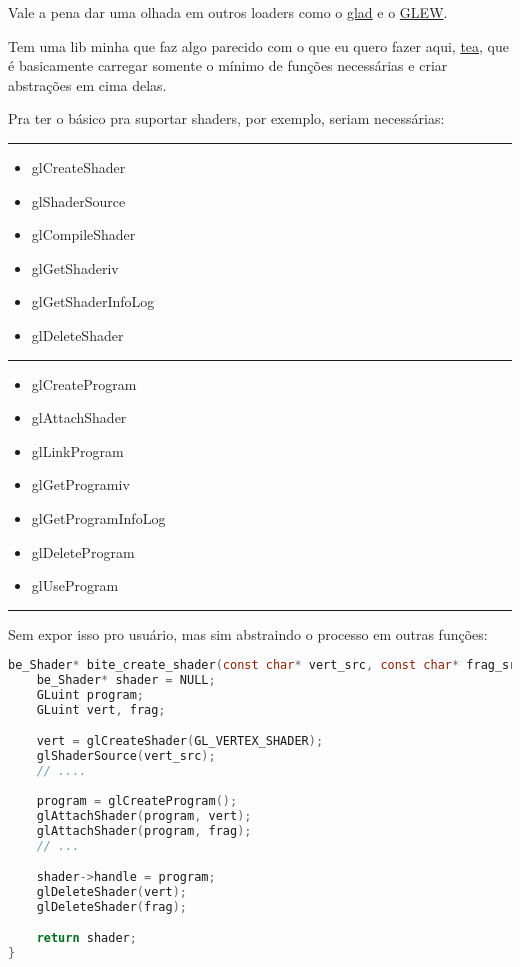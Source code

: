 \documentclass[a4paper,oneside,12pt]{article}
\begin{document}
Vale a pena dar uma olhada em outros loaders como o \href{https://glad.dav1d.de/}{glad} e o \href{https://glew.sourceforge.net/}{GLEW}.

Tem uma lib minha que faz algo parecido com o que eu quero fazer aqui, \href{https://github.com/cafe-engine/tea}{tea}, que é basicamente carregar somente o mínimo de funções necessárias e criar abstrações em cima delas.

Pra ter o básico pra suportar shaders, por exemplo, seriam necessárias:

\noindent\rule{\textwidth}{0.4pt}
\begin{itemize}
    \item glCreateShader
    \item glShaderSource
    \item glCompileShader
    \item glGetShaderiv
    \item glGetShaderInfoLog
    \item glDeleteShader
\end{itemize}
\noindent\rule{\textwidth}{0.4pt}
\begin{itemize}
    \item glCreateProgram
    \item glAttachShader
    \item glLinkProgram
    \item glGetProgramiv
    \item glGetProgramInfoLog
    \item glDeleteProgram
    \item glUseProgram
\end{itemize}
\noindent\rule{\textwidth}{0.4pt}

\noindent
Sem expor isso pro usuário, mas sim abstraindo o processo em outras funções:
\begin{lstlisting}[language=C]
be_Shader* bite_create_shader(const char* vert_src, const char* frag_src) {
    be_Shader* shader = NULL;
    GLuint program;
    GLuint vert, frag;

    vert = glCreateShader(GL_VERTEX_SHADER);
    glShaderSource(vert_src);
    // ....
    
    program = glCreateProgram();
    glAttachShader(program, vert);
    glAttachShader(program, frag);
    // ...

    shader->handle = program;
    glDeleteShader(vert);
    glDeleteShader(frag);

    return shader;
}
\end{lstlisting}
\end{document}
